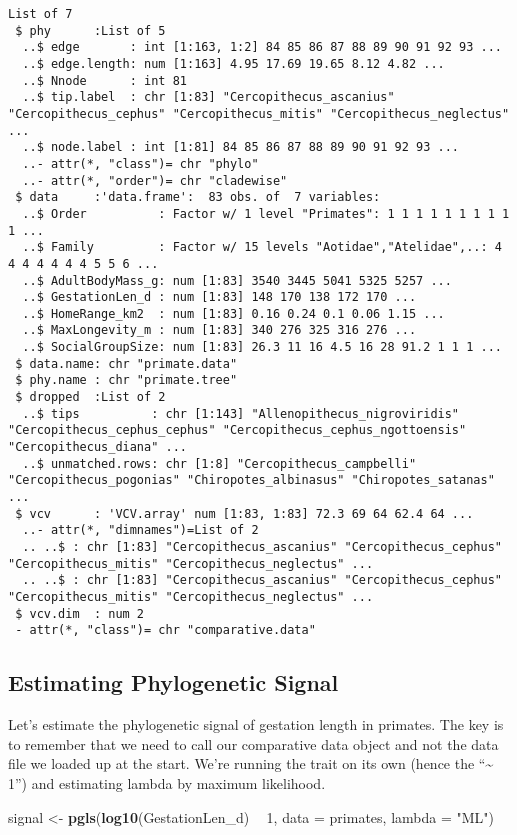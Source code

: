 \documentclass[]{book}
\newenvironment{Shaded}{\begin{snugshade}}{\end{snugshade}}
\newcommand{\KeywordTok}[1]{\textcolor[rgb]{0.13,0.29,0.53}{\textbf{#1}}}
\newcommand{\DataTypeTok}[1]{\textcolor[rgb]{0.13,0.29,0.53}{#1}}
\newcommand{\DecValTok}[1]{\textcolor[rgb]{0.00,0.00,0.81}{#1}}
\newcommand{\StringTok}[1]{\textcolor[rgb]{0.31,0.60,0.02}{#1}}
\newcommand{\OperatorTok}[1]{\textcolor[rgb]{0.81,0.36,0.00}{\textbf{#1}}}
\newcommand{\NormalTok}[1]{#1}
\begin{document}
\begin{verbatim}
List of 7
 $ phy      :List of 5
  ..$ edge       : int [1:163, 1:2] 84 85 86 87 88 89 90 91 92 93 ...
  ..$ edge.length: num [1:163] 4.95 17.69 19.65 8.12 4.82 ...
  ..$ Nnode      : int 81
  ..$ tip.label  : chr [1:83] "Cercopithecus_ascanius" "Cercopithecus_cephus" "Cercopithecus_mitis" "Cercopithecus_neglectus" ...
  ..$ node.label : int [1:81] 84 85 86 87 88 89 90 91 92 93 ...
  ..- attr(*, "class")= chr "phylo"
  ..- attr(*, "order")= chr "cladewise"
 $ data     :'data.frame':  83 obs. of  7 variables:
  ..$ Order          : Factor w/ 1 level "Primates": 1 1 1 1 1 1 1 1 1 1 ...
  ..$ Family         : Factor w/ 15 levels "Aotidae","Atelidae",..: 4 4 4 4 4 4 4 5 5 6 ...
  ..$ AdultBodyMass_g: num [1:83] 3540 3445 5041 5325 5257 ...
  ..$ GestationLen_d : num [1:83] 148 170 138 172 170 ...
  ..$ HomeRange_km2  : num [1:83] 0.16 0.24 0.1 0.06 1.15 ...
  ..$ MaxLongevity_m : num [1:83] 340 276 325 316 276 ...
  ..$ SocialGroupSize: num [1:83] 26.3 11 16 4.5 16 28 91.2 1 1 1 ...
 $ data.name: chr "primate.data"
 $ phy.name : chr "primate.tree"
 $ dropped  :List of 2
  ..$ tips          : chr [1:143] "Allenopithecus_nigroviridis" "Cercopithecus_cephus_cephus" "Cercopithecus_cephus_ngottoensis" "Cercopithecus_diana" ...
  ..$ unmatched.rows: chr [1:8] "Cercopithecus_campbelli" "Cercopithecus_pogonias" "Chiropotes_albinasus" "Chiropotes_satanas" ...
 $ vcv      : 'VCV.array' num [1:83, 1:83] 72.3 69 64 62.4 64 ...
  ..- attr(*, "dimnames")=List of 2
  .. ..$ : chr [1:83] "Cercopithecus_ascanius" "Cercopithecus_cephus" "Cercopithecus_mitis" "Cercopithecus_neglectus" ...
  .. ..$ : chr [1:83] "Cercopithecus_ascanius" "Cercopithecus_cephus" "Cercopithecus_mitis" "Cercopithecus_neglectus" ...
 $ vcv.dim  : num 2
 - attr(*, "class")= chr "comparative.data"
\end{verbatim}

\subsection{Estimating Phylogenetic
Signal}\label{estimating-phylogenetic-signal}

Let's estimate the phylogenetic signal of gestation length in primates.
The key is to remember that we need to call our comparative data object
and not the data file we loaded up at the start. We're running the trait
on its own (hence the ``\textasciitilde{} 1'') and estimating lambda by
maximum likelihood.

\begin{Shaded}
\begin{Highlighting}[]
\NormalTok{signal <-}\StringTok{ }\KeywordTok{pgls}\NormalTok{(}\KeywordTok{log10}\NormalTok{(GestationLen_d) }\OperatorTok{~}\StringTok{ }\DecValTok{1}\NormalTok{,}
               \DataTypeTok{data =}\NormalTok{ primates,}
               \DataTypeTok{lambda =} \StringTok{"ML"}\NormalTok{)}
\end{Highlighting}
\end{Shaded}
\end{document}
